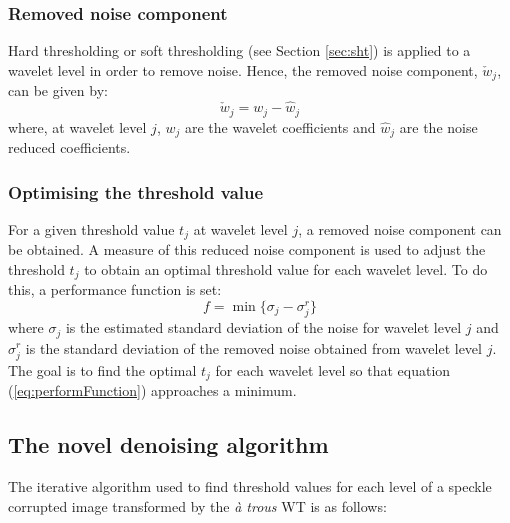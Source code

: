 \documentclass[12pt]{report}
\begin{document}
\subsubsection{Removed noise component}
Hard thresholding or soft thresholding (see Section \ref{sec:sht}) is applied to a wavelet 
level in order to remove noise. 
Hence, the removed noise component, $\check{w}_{j}$, can be given by: 
\begin{equation}
	\check{w}_{j} = w_{j} - \hat{w}_{j}
        \label{eq:wCheck}
\end{equation}
where, at wavelet level $j$, $w_{j}$ are the wavelet coefficients and 
$\hat{w}_{j}$ are the noise reduced coefficients. 

\subsubsection{Optimising the threshold value}
For a given threshold value $t_{j}$ at wavelet level $j$, a removed noise component can be obtained. A
measure of this reduced noise component is used to adjust the threshold $t_{j}$ to obtain an optimal 
threshold value for each wavelet level. To do this, a performance function is set:
\begin{equation}
        f = \min \{ \sigma_{j} - \sigma_{j}^{r} \}
        \label{eq:performFunction}
\end{equation}
where $\sigma_{j}$ is the estimated standard deviation of the noise for wavelet level $j$
and $\sigma_{j}^{r}$ is the standard deviation of the removed noise obtained from wavelet level $j$.
The goal is to find the optimal $t_{j}$ for each wavelet level so that equation (\ref{eq:performFunction})
approaches a minimum.


\subsection{The novel denoising algorithm}

The iterative algorithm used to find threshold values for each level of a speckle corrupted image
transformed by the \emph{\`a trous} WT is as follows:
\end{document}
